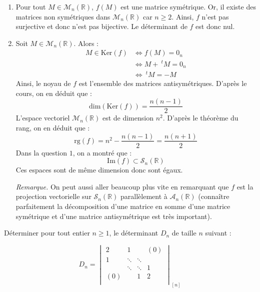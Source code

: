 \documentclass[a4paper,twoside,french,11pt]{VcCours}
\begin{document}
\begin{enumerate}
\item Pour tout $M \in \mathcal{M}_n(\mathbb{R})$, $f(M)$ est une matrice symétrique. Or, il existe des matrices non symétriques dans $\mathcal{M}_n(\mathbb{R})$ car $n \geq 2$. Ainsi, $f$ n'est pas surjective et donc n'est pas bijective. Le déterminant de $f$ est donc nul.
\item Soit $M \in \mathcal{M}_n(\mathbb{R})$. Alors :
\begin{align*}
M \in \textrm{Ker}(f) & \Longleftrightarrow f(M)=0_n \\
& \Longleftrightarrow M+~^tM= 0_n \\
& \Longleftrightarrow ~^tM=-M 
\end{align*}
Ainsi, le noyau de $f$ est l'ensemble des matrices antisymétriques. D'après le cours, on en déduit que :
$$ \textrm{dim}(\textrm{Ker}(f)) = \dfrac{n(n-1)}{2}$$
L'espace vectoriel $\mathcal{M}_n(\mathbb{R})$ est de dimension $n^2$. D'après le théorème du rang, on en déduit que :
$$ \textrm{rg}(f) = n^2 - \dfrac{n(n-1)}{2} = \dfrac{n(n+1)}{2}$$
Dans la question $1$, on a montré que :
$$ \textrm{Im}(f) \subset \mathcal{S}_n(\mathbb{R})$$
Ces espaces sont de même dimension donc sont égaux.



\noindent \textit{Remarque.} On peut aussi aller beaucoup plus vite en remarquant que $f$ est la projection vectorielle sur $\mathcal{S}_n(\mathbb{R})$ parallèlement à $\mathcal{A}_n(\mathbb{R})$ (connaître parfaitement la décomposition d'une matrice en somme d'une matrice symétrique et d'une matrice antisymétrique est très important).
\end{enumerate}



\begin{Exercice}{} Déterminer pour tout entier $n \geq 1$, le déterminant $D_n$ de taille $n$ suivant :

\[
    D_n =
    \begin{vmatrix}
        2 & 1 & {} & {(0)} \\
        1 & \ddots & \ddots & {} \\
        {} & \ddots & \ddots & 1 \\
        {(0)} & {} & 1 & 2 \\
    \end{vmatrix}_{[n]}
    \]
\end{Exercice} 
\end{document}
